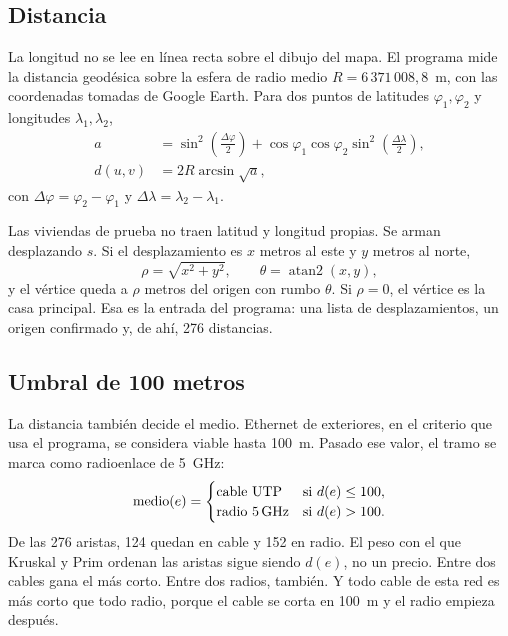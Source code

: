 \documentclass[12pt,a4paper]{article}
\begin{document}
\subsection{Distancia}

La longitud no se lee en línea recta sobre el dibujo del mapa. El programa mide la distancia geodésica sobre la esfera de radio medio \(R = 6\,371\,008{,}8\)~m, con las coordenadas tomadas de Google Earth. Para dos puntos de latitudes \(\varphi_1,\varphi_2\) y longitudes \(\lambda_1,\lambda_2\),
\begin{equation}
  \begin{aligned}
    a &= \sin^{2}\!\left(\frac{\Delta\varphi}{2}\right)
        + \cos\varphi_1\cos\varphi_2\sin^{2}\!\left(\frac{\Delta\lambda}{2}\right),\\
    d(u,v) &= 2R\arcsin\sqrt{a},
  \end{aligned}
  \label{eq:haversine}
\end{equation}
con \(\Delta\varphi = \varphi_2 - \varphi_1\) y \(\Delta\lambda = \lambda_2 - \lambda_1\).

Las viviendas de prueba no traen latitud y longitud propias. Se arman desplazando \(s\). Si el desplazamiento es \(x\) metros al este y \(y\) metros al norte,
\begin{equation}
  \rho = \sqrt{x^{2} + y^{2}}, \qquad \theta = \operatorname{atan2}(x,y),
  \label{eq:offset}
\end{equation}
y el vértice queda a \(\rho\) metros del origen con rumbo \(\theta\). Si \(\rho = 0\), el vértice es la casa principal. Esa es la entrada del programa: una lista de desplazamientos, un origen confirmado y, de ahí, 276 distancias.

\subsection{Umbral de 100 metros}

La distancia también decide el medio. Ethernet de exteriores, en el criterio que usa el programa, se considera viable hasta 100~m. Pasado ese valor, el tramo se marca como radioenlace de 5~GHz:
\begin{equation}
  \text{medio}(e) =
  \begin{cases}
    \text{cable UTP} & \text{si } d(e) \le 100,\\
    \text{radio 5\,GHz} & \text{si } d(e) > 100.
  \end{cases}
  \label{eq:medio}
\end{equation}
De las 276 aristas, 124 quedan en cable y 152 en radio. El peso con el que Kruskal y Prim ordenan las aristas sigue siendo \(d(e)\), no un precio. Entre dos cables gana el más corto. Entre dos radios, también. Y todo cable de esta red es más corto que todo radio, porque el cable se corta en 100~m y el radio empieza después.
\end{document}
